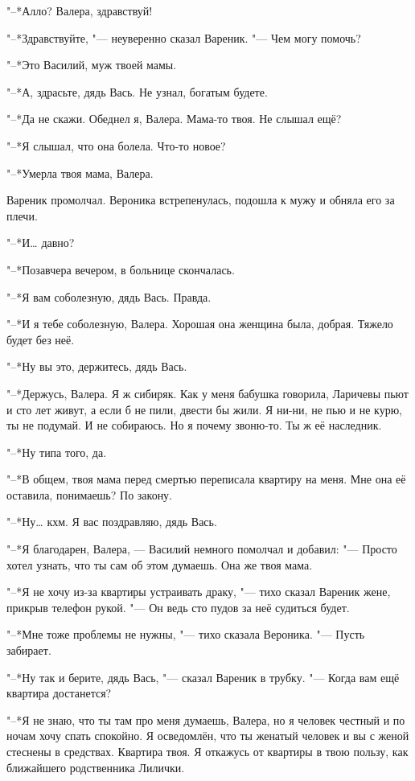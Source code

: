 "--*Алло?
Валера, здравствуй!

"--*Здравствуйте, "--- неуверенно сказал Вареник.
"--- Чем могу помочь?

"--*Это Василий, муж твоей мамы.

"--*А, здрасьте, дядь Вась.
Не узнал, богатым будете.

"--*Да не скажи.
Обеднел я, Валера.
Мама-то твоя.
Не слышал ещё?

"--*Я слышал, что она болела.
Что-то новое?

"--*Умерла твоя мама, Валера.

Вареник промолчал.
Вероника встрепенулась, подошла к мужу и обняла его за плечи.

"--*И\ldots{} давно?

"--*Позавчера вечером, в больнице скончалась.

"--*Я вам соболезную, дядь Вась.
Правда.

"--*И я тебе соболезную, Валера.
Хорошая она женщина была, добрая.
Тяжело будет без неё.

"--*Ну вы это, держитесь, дядь Вась.

"--*Держусь, Валера.
Я ж сибиряк.
Как у меня бабушка говорила, Ларичевы пьют и сто лет живут, а если б не пили, двести бы жили.
Я ни-ни, не пью и не курю, ты не подумай.
И не собираюсь.
Но я почему звоню-то.
Ты ж её наследник.

"--*Ну типа того, да.

"--*В общем, твоя мама перед смертью переписала квартиру на меня.
Мне она её оставила, понимаешь?
По закону.

"--*Ну\ldots{} кхм.
Я вас поздравляю, дядь Вась.

"--*Я благодарен, Валера, --- Василий немного помолчал и добавил:
"--- Просто хотел узнать, что ты сам об этом думаешь.
Она же твоя мама.

"--*Я не хочу из-за квартиры устраивать драку, "--- тихо сказал Вареник жене, прикрыв телефон рукой.
"--- Он ведь сто пудов за неё судиться будет.

"--*Мне тоже проблемы не нужны, "--- тихо сказала Вероника.
"--- Пусть забирает.

"--*Ну так и берите, дядь Вась, "--- сказал Вареник в трубку.
"--- Когда вам ещё квартира достанется?

"--*Я не знаю, что ты там про меня думаешь, Валера, но я человек честный и по ночам хочу спать спокойно.
Я осведомлён, что ты женатый человек и вы с женой стеснены в средствах.
Квартира твоя.
Я откажусь от квартиры в твою пользу, как ближайшего родственника Лилички.

